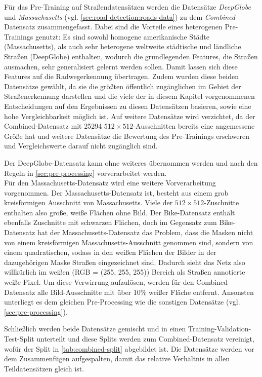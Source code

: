 Für das Pre-Training auf Straßendatensätzen werden die Datensätze \textit{DeepGlobe} und \textit{Massachusetts} 
(vgl. \autoref{sec:road-detection:roads-data}) zu dem \textit{Combined}-Datensatz zusammengefasst. 
Dabei sind die Vorteile eines heterogenen Pre-Trainings genutzt: Es sind sowohl homogene amerikanische Städte (Massachusetts), 
als auch sehr heterogene weltweite städtische und ländliche Straßen (DeepGlobe) enthalten, wodurch 
die grundlegenden Features, die Straßen ausmachen, sehr generalisiert gelernt werden sollen. Damit lassen sich diese 
Features auf die Radwegerkennung übertragen. Zudem wurden diese beiden Datensätze gewählt, da sie die größten öffentlich zugänglichen 
im Gebiet der Straßenerkennung darstellen und die viele der in diesem Kapitel vorgenommenen Entscheidungen 
auf den Ergebnissen zu diesen Datensätzen basieren, sowie eine hohe Vergleichbarkeit möglich ist. 
Auf weitere Datensätze wird verzichtet, da der Combined-Datensatz mit 25294 $512 \times 512$-Ausschnitten 
bereits eine angemessene Größe hat und weitere Datensätze die Bewertung des Pre-Trainings erschweren und Vergleichswerte 
darauf nicht zugänglich sind. 

Der DeepGlobe-Datensatz kann ohne weiteres übernommen werden und nach den Regeln in \autoref{sec:pre-processing} vorverarbeitet werden. \\ 
Für den Massachusetts-Datensatz wird eine weitere Vorverarbeitung vorgenommen. Der Massachusetts-Datensatz ist, 
besteht aus einem grob kreisförmigen Ausschnitt von Massachusetts. Viele der $512 \times 512$-Zuschnitte enthalten 
also große, weiße Flächen ohne Bild. Der Bike-Datensatz enthält ebenfalls Zuschnitte mit schwarzen Flächen, 
doch im Gegensatz zum Bike-Datensatz hat der Massachusetts-Datensatz das Problem, dass die Masken nicht von einem 
kreisförmigen Massachusetts-Ausschnitt genommen sind, sondern von einem quadratischen, sodass in den weißen Flächen 
der Bilder in der dazugehörigen Maske Straßen eingezeichnet sind. Dadurch sieht das Netz also willkürlich 
im weißen (RGB = (255, 255, 255)) Bereich als Straßen annotierte weiße Pixel. Um diese Verwirrung aufzulösen, werden 
für den Combined-Datensatz alle Bild-Ausschnitte mit über 10\% weißer Fläche entfernt. 
Ansonsten unterliegt es dem gleichen Pre-Processing wie die sonstigen Datensätze (vgl. \autoref{sec:pre-processing}). 

Schließlich werden beide Datensätze gemischt und in einen Training-Validation-Test-Split unterteilt und diese Splits werden zum 
Combined-Datensatz vereinigt, wofür der Split in \autoref{tab:combined-split} abgebildet ist. 
Die Datensätze werden vor dem Zusammenfügen aufgespalten, damit das relative Verhältnis in allen Teildatensätzen gleich ist.  

